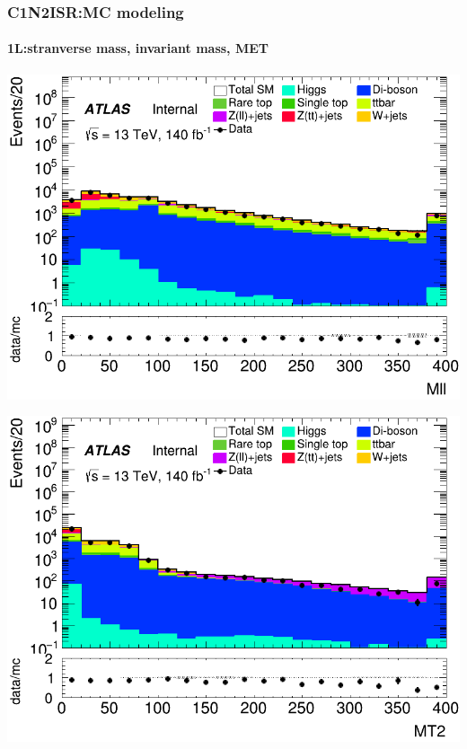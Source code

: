\documentclass[usenames,dvipsnames]{beamer}
\begin{document}
\begin{frame}
\frametitle{C1N2ISR:MC modeling}
\framesubtitle{1L:\quad stranverse mass, invariant mass, MET}
    \begin{minipage}{0.32\textwidth}
        \centering
        \includegraphics[width=\textwidth]{graphics/L_met/L_met_Mll.png}
    \end{minipage}
    \hfill
    \begin{minipage}{0.32\textwidth}
        \centering
        \includegraphics[width=\textwidth]{graphics/L_met/L_met_MT2.png}
    \end{minipage}
    \hfill
    

\end{frame}
\end{document}
